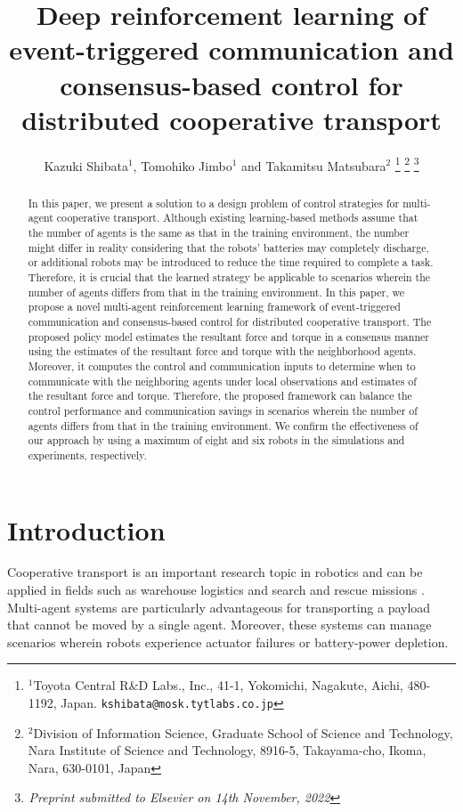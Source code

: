 \documentclass[letterpaper, 10 pt, conference]{ieeeconf} %
\title{\LARGE \bf
Deep reinforcement learning of event-triggered communication and consensus-based control for distributed cooperative transport
}
\author{Kazuki Shibata$^{1}$, Tomohiko Jimbo$^{1}$ and Takamitsu Matsubara$^{2}$%
\thanks{$^{1}$Toyota Central R$\&$D Labs., Inc., 41-1, Yokomichi, Nagakute, Aichi, 480-1192, Japan.
{\tt\small kshibata@mosk.tytlabs.co.jp}}%
\thanks{$^{2}$Division of Information Science, Graduate School of Science and Technology, Nara Institute of Science and Technology, 8916-5, Takayama-cho, Ikoma, Nara, 630-0101, Japan
{}}%
\thanks{$^{}$\it{}Preprint submitted to Elsevier on 14th November, 2022
{}}%
}
\begin{document}
\maketitle
\thispagestyle{empty}
\pagestyle{empty}

\begin{abstract}
In this paper, we present a solution to a design problem of control strategies for multi-agent cooperative transport. Although existing learning-based methods assume that the number of agents is the same as that in the training environment, the number might differ in reality considering that the robots' batteries may completely discharge, or additional robots may be introduced to reduce the time required to complete a task. Therefore, it is crucial that the learned strategy be applicable to scenarios wherein the number of agents differs from that in the training environment. In this paper, we propose a novel multi-agent reinforcement learning framework of event-triggered communication and consensus-based control for distributed cooperative transport. The proposed policy model estimates the resultant force and torque in a consensus manner using the estimates of the resultant force and torque with the neighborhood agents. Moreover, it computes the control and communication inputs to determine when to communicate with the neighboring agents under local observations and estimates of the resultant force and torque. Therefore, the proposed framework can balance the control performance and communication savings in scenarios wherein the number of agents differs from that in the training environment. We confirm the effectiveness of our approach by using a maximum of eight and six robots in the simulations and experiments, respectively.
\end{abstract}

\section{Introduction}
Cooperative transport is an important research topic in robotics and can be applied in fields such as warehouse logistics \cite{DAndrea2012, Barrientos2011} and search and rescue missions \cite{Queralta2020}. Multi-agent systems are particularly advantageous for transporting a payload that cannot be moved by a single agent.
Moreover, these systems can manage scenarios wherein robots experience actuator failures or battery-power depletion.
\end{document}
